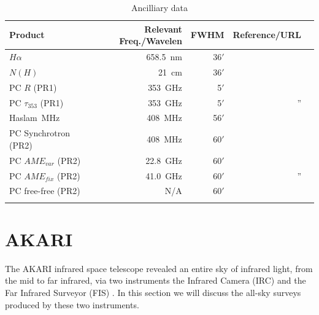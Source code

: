     \begin{table}[h]
      \caption{Ancilliary data}
      \centering
        \begin{tabular}{lrrrr}
        \hline\hline
        Product   & Relevant Freq./Wavelen  & FWHM    & Reference/URL \\
        \hline
        $H\alpha{}$  & 658.5~nm  & 36$'$  & \tablefootnote{\cite{finkbeiner03}: \url{https://lambda.gsfc.nasa.gov/product/foreground/halpha_map.cfm}} \\
        $N(H)$       & 21~cm     & 36$'$  & \tablefootnote{\cite{kalberla05}: \url{https://lambda.gsfc.nasa.gov/product/foreground/fg_LAB_HI_Survey_get.cfm}} \\
        PC $R$ (PR1)          & 353~GHz   & 5$'$   & \tablefootnote{\cite{}: \url{http://irsa.ipac.caltech.edu/data/Planck/release_1/all-sky-maps/previews/HFI_CompMap_ThermalDustModel_2048_R1.20/index.html} }\\
        PC $\tau_{353}$ (PR1) & 353~GHz   & 5$'$    & '' \\
        Haslam~MHz   & 408~MHz   & 56$'$  & \tablefootnote{\cite{haslam82}} \\
        PC Synchrotron (PR2) & 408~MHz & 60$'$ & \tablefootnote{\cite{planck15X}: \url{http://irsa.ipac.caltech.edu/data/Planck/release_2/all-sky-maps/previews/COM_CompMap_Synchrotron-commander_0256_R2.00/index.html}} \\
        PC $AME_{var}$ (PR2) & 22.8~GHz & 60$'$ & \tablefootnote{\url{http://irsa.ipac.caltech.edu/data/Planck/release_2/all-sky-maps/previews/COM_CompMap_AME-commander_0256_R2.00/index.html}} \\
        PC $AME_{fix}$ (PR2) & 41.0~GHz & 60$'$ & '' \\
        PC free-free (PR2) & N/A & 60$'$ & \tablefootnote{\url{http://irsa.ipac.caltech.edu/data/Planck/release_2/all-sky-maps/previews/COM_CompMap_freefree-commander_0256_R2.00/index.html}} \\
        \hline
         \label{tab:ancilliarydata}
      \end{tabular}
    \end{table}

  \section{AKARI}
  \label{sec:AKARI}
       The AKARI infrared space telescope revealed an entire sky of infrared light, from the mid to far infrared, via two instruments \citep{akari07} the Infrared Camera (IRC)\citep{irc07} and the Far Infrared Surveyor (FIS) \citep{fis07}. In this section we will discuss the all-sky surveys produced by these two instruments.
